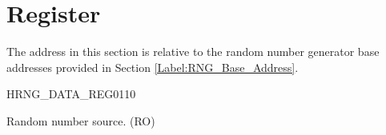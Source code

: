 \documentclass[main\_\_EN.tex]{subfiles}
\begin{document}
\section{Register}
The address in this section is relative to the random number generator base addresses provided in Section \ref{Label:RNG_Base_Address}.

\begin{register}{H}{RNG\_DATA\_REG}{\hexprefix{}0110}\label{regdesc:RNGDATAREG}
%
\regnewline%
\begin{regdesc}\begin{reglist}
\item [RNG\_DATA] Random number source. (RO)
\end{reglist}\end{regdesc}
\end{register}
\end{document}
